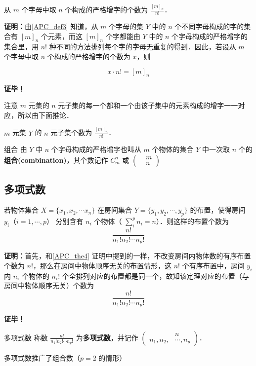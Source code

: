 \begin{theorem}{}\label{APC_the3}
从 $m$ 个字母中取 $n$ 个构成的严格增字的个数为 $\frac{[m]_n}{n!}$．
\end{theorem}
\textbf{证明：}由\autoref{APC_def3} 知道，从 $m$ 个字母的集 $Y$ 中的 $n$ 个不同字母构成的字的集合有 $[m]_n$ 个元素，而这 $[m]_n$ 个字都能由 $Y$ 中的 $n$ 个字母构成的严格增字的集合里，用 $n!$ 种不同的方法排列每个字的字母无重复的得到．因此，若设从 $m$ 个字母中取 $n$ 个构成的严格增字的个数为 $x$，则

\begin{equation}
x\cdot n!=[m]_n
\end{equation}

\textbf{证毕！}

注意 $m$ 元集的 $n$ 元子集的每一个都和一个由该子集中的元素构成的增字一一对应，所以由下面推论．
\begin{corollary}{}
$m$ 元集 $Y$ 的 $n$ 元子集个数为 $\frac{[m]_n}{n!}$．
\end{corollary}

\begin{definition}{组合}
由 $Y$ 中 $n$ 个字母构成的严格增字也叫从 $m$ 个物体的集合 $Y$ 中一次取 $n$ 个的\textbf{组合(combination)}，其个数记作 $C_m^n$ 或 $\left(\begin{aligned}&m\\&n\end{aligned}\right)$
\end{definition}
\subsection{多项式数}
\begin{theorem}{}
若物体集合 $X=\{x_1,x_2,\cdots x_n\}$ 在房间集合 $Y=\{y_1,y_2,\cdots,y_p\}$ 的布置，使得房间 $y_i$（$i=1,\cdots,p$） 分别含有 $n_i$ 个物体（ $\sum_{i}^p n_i=n$）．则这样的布置个数为
\begin{equation}
\frac{n!}{n_1!n_2!\cdots n_p!}
\end{equation}
 
\end{theorem}
\textbf{证明：}首先，和\autoref{APC_the4} 证明中提到的一样，不改变房间内物体数的有序布置个数为 $n!$，那么在房间中物体顺序无关的布置情形，这 $n!$ 个有序布置中，房间 $y_i$ 内 $n_i$ 个物体的 $n_i !$ 个全排列对应的布置都是同一个，故知该定理对应的布置（与房间中物体顺序无关）个数为
\begin{equation}
\frac{n!}{n_1!n_2!\cdots n_p!}
\end{equation}

\textbf{证毕！}

\begin{definition}{多项式数}
称数 $\frac{n!}{n_1!n_2!\cdots n_p!}$ 为\textbf{多项式数}，并记作 $\left(\begin{aligned}
&n\\n_1,n_2,&\cdots,n_p
\end{aligned}\right)$．
\end{definition}

多项式数推广了组合数（$p=2$ 的情形）